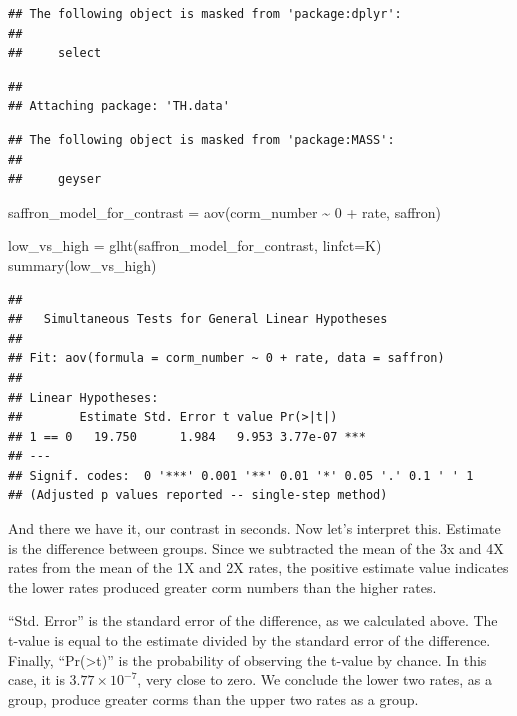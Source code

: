 \documentclass[
]{book}
\newenvironment{Shaded}{\begin{snugshade}}{\end{snugshade}}
\newcommand{\AttributeTok}[1]{\textcolor[rgb]{0.77,0.63,0.00}{#1}}
\newcommand{\DecValTok}[1]{\textcolor[rgb]{0.00,0.00,0.81}{#1}}
\newcommand{\FunctionTok}[1]{\textcolor[rgb]{0.00,0.00,0.00}{#1}}
\newcommand{\NormalTok}[1]{#1}
\newcommand{\OtherTok}[1]{\textcolor[rgb]{0.56,0.35,0.01}{#1}}
\newcommand{\SpecialCharTok}[1]{\textcolor[rgb]{0.00,0.00,0.00}{#1}}
\begin{document}
\begin{verbatim}
## The following object is masked from 'package:dplyr':
## 
##     select
\end{verbatim}

\begin{verbatim}
## 
## Attaching package: 'TH.data'
\end{verbatim}

\begin{verbatim}
## The following object is masked from 'package:MASS':
## 
##     geyser
\end{verbatim}

\begin{Shaded}
\begin{Highlighting}[]
\NormalTok{saffron\_model\_for\_contrast }\OtherTok{=} \FunctionTok{aov}\NormalTok{(corm\_number }\SpecialCharTok{\textasciitilde{}} \DecValTok{0} \SpecialCharTok{+}\NormalTok{ rate, saffron)}

\NormalTok{low\_vs\_high }\OtherTok{=} \FunctionTok{glht}\NormalTok{(saffron\_model\_for\_contrast, }\AttributeTok{linfct=}\NormalTok{K)}
\FunctionTok{summary}\NormalTok{(low\_vs\_high)}
\end{Highlighting}
\end{Shaded}

\begin{verbatim}
## 
##   Simultaneous Tests for General Linear Hypotheses
## 
## Fit: aov(formula = corm_number ~ 0 + rate, data = saffron)
## 
## Linear Hypotheses:
##        Estimate Std. Error t value Pr(>|t|)    
## 1 == 0   19.750      1.984   9.953 3.77e-07 ***
## ---
## Signif. codes:  0 '***' 0.001 '**' 0.01 '*' 0.05 '.' 0.1 ' ' 1
## (Adjusted p values reported -- single-step method)
\end{verbatim}

And there we have it, our contrast in seconds. Now let's interpret this. Estimate is the difference between groups. Since we subtracted the mean of the 3x and 4X rates from the mean of the 1X and 2X rates, the positive estimate value indicates the lower rates produced greater corm numbers than the higher rates.

``Std. Error'' is the standard error of the difference, as we calculated above. The t-value is equal to the estimate divided by the standard error of the difference. Finally, ``Pr(\textgreater\textbar t\textbar)'' is the probability of observing the t-value by chance. In this case, it is \(3.77 \times 10^{-7}\), very close to zero. We conclude the lower two rates, as a group, produce greater corms than the upper two rates as a group.
\end{document}
